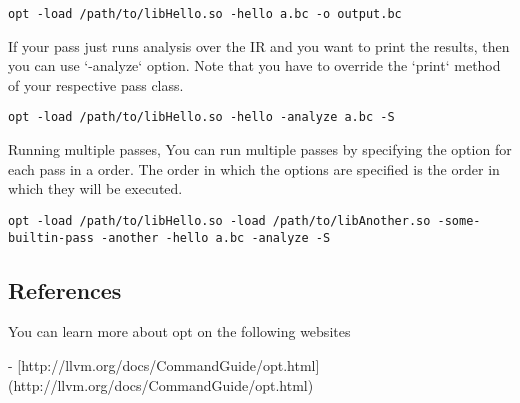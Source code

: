 \begin{lstlisting}
opt -load /path/to/libHello.so -hello a.bc -o output.bc
\end{lstlisting}

If your pass just runs analysis over the IR and you want to print the results,
then you can use `-analyze` option. Note that you have to override the `print`
method of your respective pass class.

\begin{lstlisting}
opt -load /path/to/libHello.so -hello -analyze a.bc -S
\end{lstlisting}

Running multiple passes,
You can run multiple passes by specifying the option for each pass in a order.
The order in which the options are specified is the order in which they will be
executed.

\begin{lstlisting}
opt -load /path/to/libHello.so -load /path/to/libAnother.so -some-builtin-pass -another -hello a.bc -analyze -S
\end{lstlisting}

\subsection{References}
You can learn more about opt on the following websites

 - [http://llvm.org/docs/CommandGuide/opt.html](http://llvm.org/docs/CommandGuide/opt.html)
